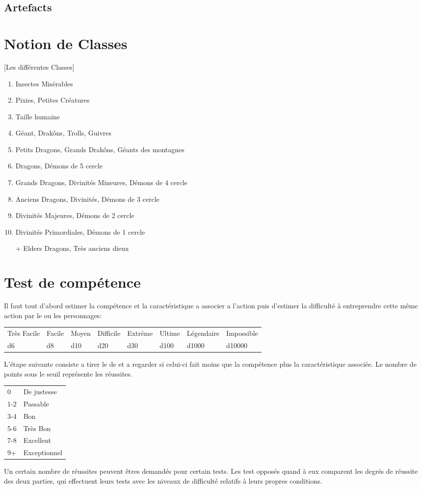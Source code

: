 \subsection{Artefacts}
\section{Notion de Classes}
\label{Classes}[Les différentes Classes]
\begin{enumerate}
    \item Insectes Misérables
    \item Pixies, Petites Créatures
    \item Taille humaine
    \item Géant, Drakôns, Trolls, Guivres
    \item Petits Dragons, Grands Drakôns, Géants des montagnes
    \item Dragons, Démons de 5 cercle
    \item Grands Dragons, Divinités Mineures, Démons de 4 cercle
    \item Anciens Dragons, Divinités, Démons de 3 cercle
    \item Divinités Majeures, Démons de 2 cercle
    \item Divinités Primordiales, Démons de 1 cercle
    \item[+] Elders Dragons, Très anciens dieux
\end{enumerate}

\section{Test de compétence}
Il faut tout d'abord estimer la compétence et la caractéristique a associer a l'action puis d'estimer la difficulté à entreprendre cette même action par le ou les personnages:
\begin{center}
\begin{tabular}{llllllll}
Très Facile & Facile & Moyen & Difficile & Extréme & Ultime & Légendaire & Impossible\\
d6 & d8 & d10 & d20 & d30 & d100 & d1000 & d10000
\end{tabular}
\end{center}

L'étape suivante consiste a tirer le de et a regarder si celui-ci fait moins que la compétence plus la caractéristique associée. Le nombre de points sous le seuil représente les réussites.
\begin{center}
\begin{tabular}{ll}
0   & De justesse\\
1-2 & Passable\\
3-4 & Bon\\
5-6 & Très Bon\\
7-8 & Excellent\\
9+  & Exceptionnel
\end{tabular}
\end{center}
Un certain nombre de réussites peuvent êtres demandés pour certain tests. Les test opposés quand à eux comparent les degrés de réussite des deux parties, qui effectuent leurs tests avec les niveaux de difficulté relatifs à leurs propres conditions.

